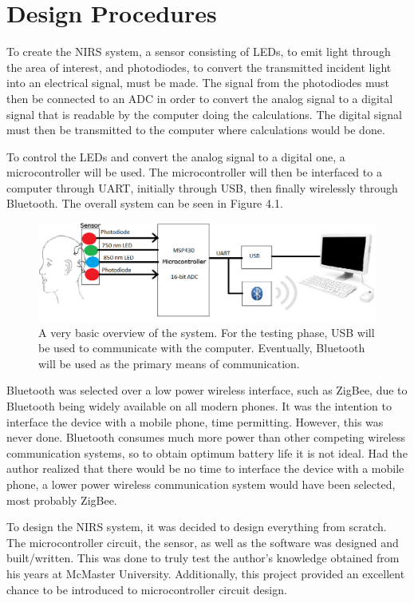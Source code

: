 \chapter{Design Procedures}

To create the NIRS system, a sensor consisting of LEDs, to emit light through the area of interest, and photodiodes, to convert the transmitted incident light into an electrical signal, must be made. The signal from the photodiodes must then be connected to an ADC in order to convert the analog signal to a digital signal that is readable by the computer doing the calculations. The digital signal must then be transmitted to the computer where calculations would be done.

To control the LEDs and convert the analog signal to a digital one, a microcontroller will be used. The microcontroller will then be interfaced to a computer through UART, initially through USB, then finally wirelessly through Bluetooth. The overall system can be seen in Figure 4.1.

\begin{figure}[htp]
\centering
\includegraphics[width=6in]{design.png}
\caption[A very basic overview of the system.]{A very basic overview of the system. For the testing phase, USB will be used to communicate with the computer. Eventually, Bluetooth will be used as the primary means of communication.}
\end{figure}

Bluetooth was selected over a low power wireless interface, such as ZigBee, due to Bluetooth being widely available on all modern phones. It was the intention to interface the device with a mobile phone, time permitting. However, this was never done. Bluetooth consumes much more power than other competing wireless communication systems, so to obtain optimum battery life it is not ideal. Had the author realized that there would be no time to interface the device with a mobile phone, a lower power wireless communication system would have been selected, most probably ZigBee.

To design the NIRS system, it was decided to design everything from scratch. The microcontroller circuit, the sensor, as well as the software was designed and built/written. This was done to truly test the author's knowledge obtained from his years at McMaster University. Additionally, this project provided an excellent chance to be introduced to microcontroller circuit design.

